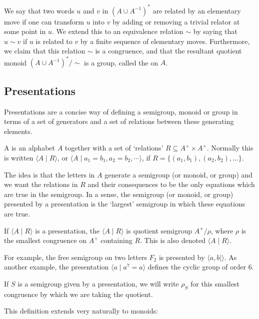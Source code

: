 \documentclass[noindex,noinsetproof,emphthm,12pt]{lmaths}
\begin{document}
We say that two words $u$ and $v$ in $(A \cup A^{-1})^*$ are related by an elementary move if one can transform $u$ into $v$ by adding or removing a trivial relator at some point in $u$. We extend this to an equivalence relation $\sim$ by saying that $u \sim v$ if $u$ is related to $v$ by a finite sequence of elementary moves.  Furthermore, we claim that this relation $\sim$ is a congruence, and that the resultant quotient monoid $(A \cup A^{-1})^*/{\sim}$ is a group, called the  on $A$.

\subsection{Presentations}

Presentations are a concise way of defining a semigroup, monoid or group in terms of a set of generators and a set of relations between these generating elements.

\begin{defn}
	A  is an alphabet $A$ together with a set of `relations' $R \subseteq A^+ \times A^+$. Normally this is written $\langle A \mid R\rangle$, or $\langle A \mid a_1 = b_1, a_2 = b_2, \cdots \rangle$, if $R = \{(a_1, b_1), (a_2, b_2), \ldots\}$.
\end{defn}

The idea is that the letters in $A$ generate a semigroup (or monoid, or group) and we want the relations in $R$ and their consequences to be the only equations which are true in the semigroup. In a sense, the semigroup (or monoid, or group) presented by a presentation is the `largest' semigroup in which these equations are true.

\begin{defn}
	If $\langle A \mid R \rangle$ is a presentation, the  $\langle A \mid R\rangle$ is quotient semigroup $A^+/\rho$, where $\rho$ is the smallest congruence on $A^+$ containing $R$. This is also denoted $\langle A \mid R \rangle$.
\end{defn}

For example, the free semigroup on two letters $F_2$ is presented by $\langle a, b \mid \rangle$. As another example, the presentation $\langle a \mid a^7 = a \rangle$ defines the cyclic group of order 6.

If $S$ is a semigroup given by a presentation, we will write $\rho_S$ for this smallest congruence by which we are taking the quotient.

This definition extends very naturally to monoids:
\end{document}

